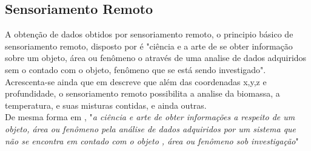 	\subsection{Sensoriamento Remoto}
	
	\hspace*{1.25 cm} A obtenção de dados obtidos por sensoriamento remoto, o principio básico de sensoriamento remoto, disposto por \cite[p.~24]{Reddy} é "ciência e a arte de se obter informação sobre um objeto, área ou  fenômeno o através de uma analise de dados adquiridos sem o contado com o objeto, fenômeno que se está sendo investigado".  Acrescenta-se ainda que em \cite[p.~7]{Jensensens} descreve que além das coordenadas x,y,z e profundidade, o sensoriamento remoto possibilita a analise da biomassa, a temperatura, e suas misturas contidas, e ainda outras. \\
	\hspace*{1.25 cm} De mesma forma em \cite[p.1]{Lilesat}, "\textit{a ciência e arte de obter informações a respeito de um objeto, área ou fenômeno pela análise de dados adquiridos por um sistema que não se encontra em contado com o objeto , área ou fenômeno sob investigação}" 
	
